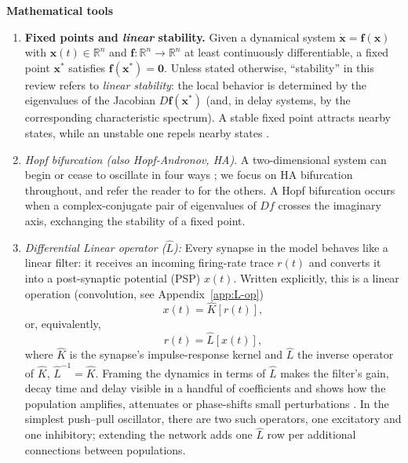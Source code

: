 \documentclass[11pt]{article}
\numberwithin{equation}{section}
\newcommand{\rev}[1]{\begingroup\color{black}#1\endgroup}
\begin{document}
  \textbf{Mathematical tools}
\begin{enumerate}
\item 
\rev{\textbf{Fixed points and \emph{linear} stability.}
Given a dynamical system $\dot{\mathbf{x}}=\mathbf{f}(\mathbf{x})$ with
$\mathbf{x}(t)\in\mathbb{R}^n$ and $\mathbf{f}:\mathbb{R}^n\to\mathbb{R}^n$ at least
continuously differentiable, a fixed point $\mathbf{x}^\ast$ satisfies
$\mathbf{f}(\mathbf{x}^\ast)=\mathbf{0}$.
Unless stated otherwise, ``stability'' in this review refers to \emph{linear stability}:
the local behavior is determined by the eigenvalues of the Jacobian
$D\mathbf{f}(\mathbf{x}^\ast)$ (and, in delay systems, by the corresponding characteristic
spectrum).}
A stable fixed point attracts nearby states, while an unstable one repels nearby states \cite{strogatz2018nonlinear}.
\item \textit{Hopf bifurcation (also \textit{Hopf-Andronov}, HA)}. \rev{A two-dimensional system can begin or cease to oscillate in four ways ; we focus on HA bifurcation throughout, and refer the reader to \cite{strogatz2018nonlinear,hoppensteadt2012weakly,kuznetsov2023elements} for the others.
A Hopf bifurcation occurs when a complex-conjugate pair of eigenvalues of $Df$ crosses the imaginary axis, exchanging the stability of a fixed point.}

\item \emph{Differential Linear operator (\(\hat L\)):} Every synapse in the model behaves like a linear filter: it receives an incoming firing-rate trace \(r(t)\) and converts it into a post-synaptic potential (PSP) \(x(t)\).  Written explicitly, this is a linear operation (convolution, see Appendix~\ref{app:L-op})
\begin{equation}
x(t)=\hat K[r(t)] ,
\end{equation}
or, equivalently,
\begin{equation}
r(t)=\hat L[x(t)] ,
\end{equation}
where \(\hat K\) is the synapse’s impulse-response kernel and \(\hat L\) the inverse operator of \(\hat K\), $\hat L^{-1} = \hat K $.  Framing the dynamics in terms of \(\hat L\) makes the filter’s gain, decay time and delay visible in a handful of coefficients and shows how the population amplifies, attenuates or phase-shifts small perturbations \cite{strogatz2018nonlinear}.  In the simplest push–pull oscillator, there are two such operators, one excitatory and one inhibitory; extending the network adds one \(\hat L\) row per additional connections between populations.


\end{enumerate}
\end{document}
